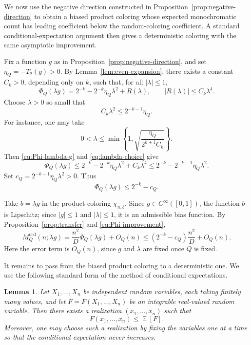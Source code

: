 \documentclass[twoside,12pt]{article}
\newcommand{\ord}{\mathrm{ord}}
\newcommand{\Mord}{M^{\ord}}
\DeclareMathOperator{\E}{\mathbb{E}}
\newcommand{\1}{\mathbf 1}
\newtheorem{lemma}{Lemma}[section]
\begin{document}
We now use the negative direction constructed in Proposition~\ref{prop:negative-direction}
to obtain a biased product coloring whose expected monochromatic count has
leading coefficient below the random-coloring coefficient.  A standard
conditional-expectation argument then gives a deterministic coloring with the
same asymptotic improvement.

Fix a function \(g\) as in Proposition~\ref{prop:negative-direction}, and set $\eta_Q=-T_2(g)>0$.
By Lemma~\ref{lem:even-expansion}, there exists a constant \(C_k>0\),
depending only on \(k\), such that, for all \(|\lambda|\le1\),
\begin{equation}\label{eq:Phi-lambda-g}
\Phi_Q(\lambda g)
=
2^{-k}
-
2^{-k}\eta_Q\lambda^2
+
R(\lambda),
\qquad
|R(\lambda)|\le C_k\lambda^4.
\end{equation}
Choose \(\lambda>0\) so small that
\begin{equation}\label{eq:lambda-choice}
C_k\lambda^2\le 2^{-k-1}\eta_Q.
\end{equation}
For instance, one may take
\[
0<\lambda\le
\min\left\{1,\sqrt{\frac{\eta_Q}{2^{k+1}C_k}}\right\}.
\]
Then \eqref{eq:Phi-lambda-g} and \eqref{eq:lambda-choice} give
\[
\Phi_Q(\lambda g)
\le
2^{-k}-2^{-k}\eta_Q\lambda^2+C_k\lambda^4
\le
2^{-k}-2^{-k-1}\eta_Q\lambda^2.
\]
Set $c_Q=2^{-k-1}\eta_Q\lambda^2>0$.
Thus
\begin{equation}\label{eq:Phi-improvement}
\Phi_Q(\lambda g)\le 2^{-k}-c_Q.
\end{equation}

Take \(b=\lambda g\) in the product coloring \(\chi_{n,b}\).  Since
\(g\in C^\infty([0,1])\), the function \(b\) is Lipschitz; since \(|g|\le1\)
and \(|\lambda|\le1\), it is an admissible bias function.  By
Proposition~\ref{prop:transfer} and \eqref{eq:Phi-improvement},
\begin{equation}\label{eq:expected-ordered}
\Mord_Q(n;\lambda g)
=
\frac{n^2}{D}\Phi_Q(\lambda g)+O_Q(n)
\le
\left(2^{-k}-c_Q\right)\frac{n^2}{D}+O_Q(n).
\end{equation}
Here the error term is \(O_Q(n)\), since \(g\) and \(\lambda\) are fixed once
\(Q\) is fixed.

It remains to pass from the biased product coloring to a deterministic one. We
use the following standard form of the method of conditional expectations.

\begin{lemma}\label{lem:cond-exp}
Let \(X_1,\dots,X_n\) be independent random variables, each taking finitely
many values, and let \(F=F(X_1,\dots,X_n)\) be an integrable real-valued random
variable.  Then there exists a realization \((x_1,\dots,x_n)\) such that
\[
F(x_1,\dots,x_n)\le \E[F].
\]
Moreover, one may choose such a realization by fixing the variables one at a
time so that the conditional expectation never increases.
\end{lemma}
\end{document}
